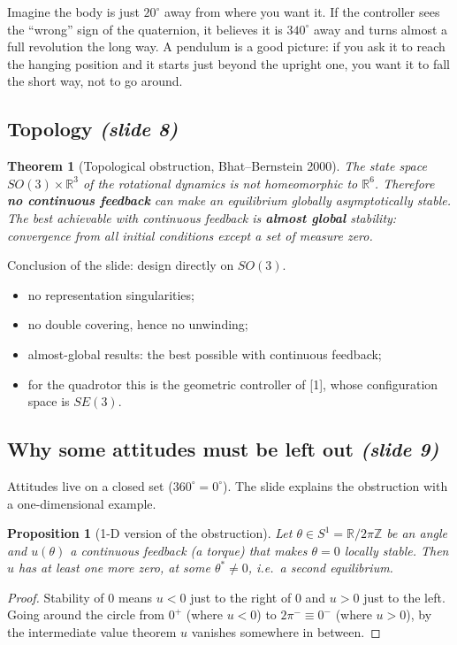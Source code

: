 \documentclass[11pt,a4paper]{article}
\newcommand{\R}{\mathbb{R}}
\newcommand{\sli}[1]{\emph{(#1)}}
\theoremstyle{definition}
\theoremstyle{plain}
\newtheorem{proposition}[definition]{Proposition}
\newtheorem{theorem}[definition]{Theorem}
\theoremstyle{remark}
\begin{document}
\begin{intuition}
Imagine the body is just $20^\circ$ away from where you want it. If the controller sees the ``wrong'' sign of the quaternion, it believes it is $340^\circ$ away and turns almost a full revolution the long way. A pendulum is a good picture: if you ask it to reach the hanging position and it starts just beyond the upright one, you want it to fall the short way, not to go around.
\end{intuition}

\subsection{Topology \sli{slide 8}}

\begin{theorem}[Topological obstruction, Bhat--Bernstein 2000]
The state space $SO(3)\times\R^3$ of the rotational dynamics is not homeomorphic to $\R^6$. Therefore \textbf{no continuous feedback} can make an equilibrium globally asymptotically stable. The best achievable with continuous feedback is \textbf{almost global} stability: convergence from all initial conditions except a set of measure zero.
\end{theorem}

Conclusion of the slide: design directly on $SO(3)$.
\begin{itemize}
  \item no representation singularities;
  \item no double covering, hence no unwinding;
  \item almost-global results: the best possible with continuous feedback;
  \item for the quadrotor this is the geometric controller of [1], whose configuration space is $SE(3)$.
\end{itemize}

\subsection{Why some attitudes must be left out \sli{slide 9}}

Attitudes live on a closed set ($360^\circ=0^\circ$). The slide explains the obstruction with a one-dimensional example.

\begin{proposition}[1-D version of the obstruction]
Let $\theta\in S^1=\R/2\pi\mathbb{Z}$ be an angle and $u(\theta)$ a continuous feedback (a torque) that makes $\theta=0$ locally stable. Then $u$ has at least one more zero, at some $\theta^\ast\ne 0$, i.e.\ a second equilibrium.
\end{proposition}
\begin{proof}
Stability of $0$ means $u<0$ just to the right of $0$ and $u>0$ just to the left. Going around the circle from $0^+$ (where $u<0$) to $2\pi^-\equiv0^-$ (where $u>0$), by the intermediate value theorem $u$ vanishes somewhere in between.
\end{proof}
\end{document}
